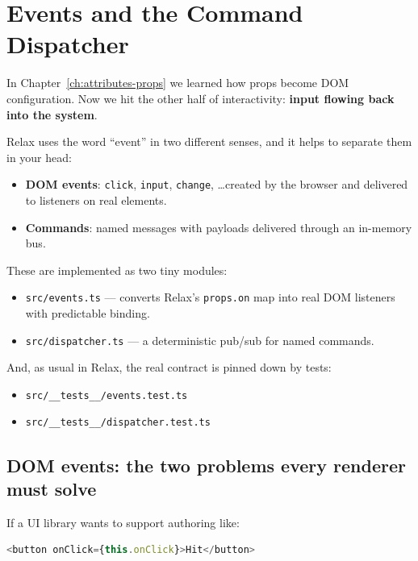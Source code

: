 \chapter{Events and the Command Dispatcher}
\label{ch:events-dispatcher}

In Chapter~\ref{ch:attributes-props} we learned how props become DOM configuration.
Now we hit the other half of interactivity: \textbf{input flowing back into the system}.

Relax uses the word ``event'' in two different senses, and it helps to separate them in your head:

\begin{itemize}
  \item \textbf{DOM events}: \texttt{click}, \texttt{input}, \texttt{change}, \dots created by the browser and delivered to listeners on real elements.
  \item \textbf{Commands}: named messages with payloads delivered through an in-memory bus.
\end{itemize}

These are implemented as two tiny modules:

\begin{itemize}
  \item \texttt{src/events.ts} --- converts Relax's \texttt{props.on} map into real DOM listeners with predictable binding.
  \item \texttt{src/dispatcher.ts} --- a deterministic pub/sub for named commands.
\end{itemize}

And, as usual in Relax, the real contract is pinned down by tests:

\begin{itemize}
  \item \texttt{src/\_\_tests\_\_/events.test.ts}
  \item \texttt{src/\_\_tests\_\_/dispatcher.test.ts}
\end{itemize}

\section{DOM events: the two problems every renderer must solve}

If a UI library wants to support authoring like:

\begin{lstlisting}[language=JavaScript]
<button onClick={this.onClick}>Hit</button>
\end{lstlisting}

